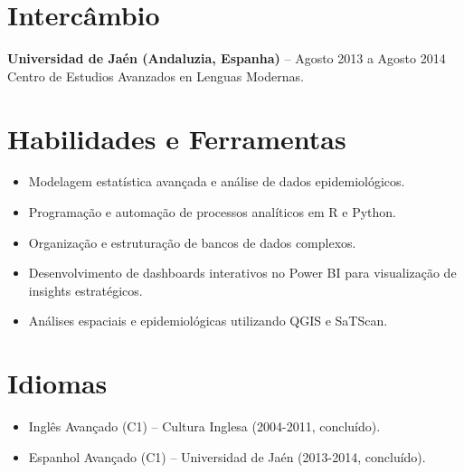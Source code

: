 \documentclass[a4paper,12pt]{article}
\begin{document}
\vspace{0.6em}

\section*{Intercâmbio}
\textbf{Universidad de Jaén (Andaluzia, Espanha)} – Agosto 2013 a Agosto 2014 \\
Centro de Estudios Avanzados en Lenguas Modernas.

\vspace{0.6em}

\section*{Habilidades e Ferramentas}
\begin{itemize}[leftmargin=*]
    \item Modelagem estatística avançada e análise de dados epidemiológicos.
    \item Programação e automação de processos analíticos em R e Python.
    \item Organização e estruturação de bancos de dados complexos.
    \item Desenvolvimento de dashboards interativos no Power BI para visualização de insights estratégicos.
    \item Análises espaciais e epidemiológicas utilizando QGIS e SaTScan.
\end{itemize}

\vspace{0.6em}

\section*{Idiomas}
\begin{itemize}[leftmargin=*]
    \item Inglês Avançado (C1) – Cultura Inglesa (2004-2011, concluído).
    \item Espanhol Avançado (C1) – Universidad de Jaén (2013-2014, concluído).
\end{itemize}
\end{document}
